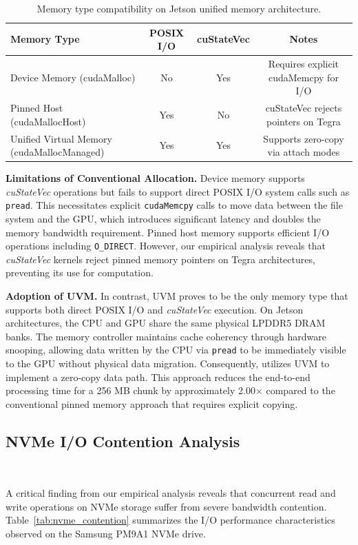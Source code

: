 \begin{table}[t]
    \centering
    \caption{Memory type compatibility on Jetson unified memory architecture.}
    \label{tab:memory_compat}
    \begin{tabular}{lccc}
    \hline
    Memory Type & POSIX I/O & cuStateVec & Notes \\
    \hline
    Device Memory (cudaMalloc) & No & Yes & Requires explicit cudaMemcpy for I/O \\
    Pinned Host (cudaMallocHost) & Yes & No & cuStateVec rejects pointers on Tegra \\
    Unified Virtual Memory (cudaMallocManaged) & Yes & Yes & Supports zero-copy via attach modes \\
    \hline
    \end{tabular}
\end{table}

\noindent\textbf{Limitations of Conventional Allocation.}
Device memory supports \textit{cuStateVec} operations but fails to support direct POSIX I/O system calls such as \texttt{pread}.
This necessitates explicit \texttt{cudaMemcpy} calls to move data between the file system and the GPU, which introduces significant latency and doubles the memory bandwidth requirement.
Pinned host memory supports efficient I/O operations including \texttt{O\_DIRECT}.
However, our empirical analysis reveals that \textit{cuStateVec} kernels reject pinned memory pointers on Tegra architectures, preventing its use for computation.

\noindent\textbf{Adoption of UVM.}
In contrast, UVM proves to be the only memory type that supports both direct POSIX I/O and \textit{cuStateVec} execution.
On Jetson architectures, the CPU and GPU share the same physical LPDDR5 DRAM banks.
The memory controller maintains cache coherency through hardware snooping, allowing data written by the CPU via \texttt{pread} to be immediately visible to the GPU without physical data migration.
Consequently, \EdgeQuantum utilizes UVM to implement a zero-copy data path.
This approach reduces the end-to-end processing time for a 256 MB chunk by approximately 2.00$\times$ compared to the conventional pinned memory approach that requires explicit copying.

\subsection{NVMe I/O Contention Analysis}~\label{design_nvme}

A critical finding from our empirical analysis reveals that concurrent read and write operations on NVMe storage suffer from severe bandwidth contention.
Table~\ref{tab:nvme_contention} summarizes the I/O performance characteristics observed on the Samsung PM9A1 NVMe drive.

